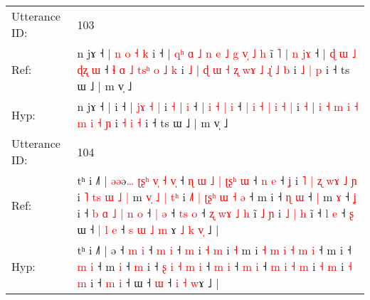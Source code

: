 \documentclass[10pt]{article}
\DeclareRobustCommand{\hl}[1]{{\textcolor{red}{#1}}}
\begin{document}
\begin{longtable}{ll}
 \\
\midrule
Utterance ID: & 103 \\
Ref: & n jɤ ˧ |\hl{ }\hl{n}\hl{ }\hl{o}\hl{ }\hl{˧}\hl{ }\hl{k} i ˧ |\hl{ }\hl{q}\hl{ʰ}\hl{ }\hl{ɑ}\hl{ }\hl{˩}\hl{ }\hl{n}\hl{ }\hl{e}\hl{ }\hl{˩}\hl{ }\hl{g} \hl{v}\hl{̩} \hl{˩} \hl{h} i\hl{̃} \hl{˥} |\hl{ }\hl{n} \hl{j}\hl{ɤ} ˧ |\hl{ }\hl{ɖ} \hl{ɯ} \hl{˩} \hl{ɖ}\hl{ʐ} \hl{ɯ} ˧ \hl{ɬ} \hl{ɑ} \hl{˩} \hl{t}\hl{s}\hl{ʰ} \hl{o} \hl{˩} \hl{k} i \hl{˩} | \hl{ɖ} \hl{ɯ} \hl{˧} \hl{ʐ} \hl{w}\hl{ɤ} \hl{˩} \hl{ɻ}\hl{̍} \hl{˩} \hl{b} i \hl{˩} \hl{|} \hl{p} i ˧ ts ɯ ˩ | m v̩ ˩
 \\
Hyp: & n jɤ ˧ |\hl{}\hl{}\hl{}\hl{}\hl{}\hl{}\hl{}\hl{} i ˧ |\hl{}\hl{}\hl{}\hl{}\hl{}\hl{}\hl{}\hl{}\hl{}\hl{}\hl{}\hl{}\hl{}\hl{}\hl{} \hl{j}\hl{ɤ} \hl{˧} \hl{|} i\hl{} \hl{˧} |\hl{}\hl{} \hl{}\hl{i} ˧ |\hl{}\hl{} \hl{i} \hl{˧} \hl{}\hl{|} \hl{i} ˧ \hl{|} \hl{i} \hl{˧} \hl{}\hl{}\hl{|} \hl{i} \hl{˧} \hl{|} i \hl{˧} | \hl{i} \hl{˧} \hl{m} \hl{i} \hl{}\hl{˧} \hl{m} \hl{}\hl{i} \hl{˧} \hl{ɲ} i \hl{˧} \hl{i} \hl{˧} i ˧ ts ɯ ˩ | m v̩ ˩
 \\
\midrule
Utterance ID: & 104 \\
Ref: & tʰ i ˩˥ | \hl{ə}\hl{ə}ə\hl{…}\hl{ }\hl{ʈ}\hl{ʂ}\hl{ʰ}\hl{ }\hl{v}\hl{̩}\hl{ }\hl{˧}\hl{ }\hl{v}\hl{̩} ˧\hl{ }\hl{ɳ}\hl{ }\hl{ɯ}\hl{ }\hl{˩}\hl{ }\hl{|} \hl{ʈ}\hl{ʂ}\hl{ʰ} \hl{ɯ} ˧ \hl{n} \hl{e} ˧ \hl{ʝ} i\hl{ }\hl{˥}\hl{ }\hl{|}\hl{ }\hl{ʐ}\hl{ }\hl{w}\hl{ɤ} \hl{˩} \hl{ɲ} i\hl{ }\hl{˥}\hl{ }\hl{t}\hl{s}\hl{ }\hl{ɯ}\hl{ }\hl{˩} \hl{|} m\hl{ }\hl{v}\hl{̩}\hl{ }\hl{˩}\hl{ }\hl{|}\hl{ }\hl{t}\hl{ʰ} i \hl{˩}\hl{˥} \hl{|} \hl{ʈ}\hl{ʂ}\hl{ʰ} \hl{ɯ} \hl{˧} \hl{ə} ˧ m i ˧ \hl{ɳ} \hl{ɯ} ˧\hl{ }\hl{|} m \hl{ɤ} ˧ \hl{ʝ} i ˧\hl{ }\hl{b} \hl{ɑ} \hl{˩} \hl{|} \hl{n} \hl{o} ˧ \hl{|} \hl{ə} ˧ \hl{t}\hl{s} \hl{o} ˧ \hl{ʐ} \hl{w}\hl{ɤ} \hl{˩} \hl{h} i\hl{̃} \hl{˩} \hl{ɲ} i\hl{ }\hl{˩} \hl{|} \hl{h} i\hl{̃} ˧ \hl{l} \hl{e} ˧\hl{ }\hl{ʂ} ɯ ˧\hl{ }\hl{|}\hl{ }\hl{l} \hl{e} ˧\hl{ }\hl{s} \hl{ɯ} \hl{˩} \hl{m}\hl{ }ɤ\hl{ }\hl{˩}\hl{ }\hl{k}\hl{ }\hl{v}\hl{̩} ˩ |
 \\
Hyp: & tʰ i ˩˥ | \hl{}\hl{}ə\hl{}\hl{}\hl{}\hl{}\hl{}\hl{}\hl{}\hl{}\hl{}\hl{}\hl{}\hl{}\hl{} ˧\hl{}\hl{}\hl{}\hl{}\hl{}\hl{}\hl{}\hl{} \hl{}\hl{}\hl{m} \hl{i} ˧ \hl{m} \hl{i} ˧ \hl{m} i\hl{}\hl{}\hl{}\hl{}\hl{}\hl{}\hl{}\hl{}\hl{} \hl{˧} \hl{m} i\hl{}\hl{}\hl{}\hl{}\hl{}\hl{}\hl{}\hl{}\hl{} \hl{˧} m\hl{}\hl{}\hl{}\hl{}\hl{}\hl{}\hl{}\hl{}\hl{}\hl{} i \hl{}\hl{˧} \hl{m} \hl{}\hl{}\hl{i} \hl{˧} \hl{m} \hl{i} ˧ m i ˧ \hl{m} \hl{i} ˧\hl{}\hl{} m \hl{i} ˧ \hl{m} i ˧\hl{}\hl{} \hl{ʂ} \hl{i} \hl{˧} \hl{m} \hl{i} ˧ \hl{m} \hl{i} ˧ \hl{}\hl{m} \hl{i} ˧ \hl{m} \hl{}\hl{i} \hl{˧} \hl{m} i\hl{} \hl{˧} \hl{m} i\hl{}\hl{} \hl{˧} \hl{m} i\hl{} ˧ \hl{m} \hl{i} ˧\hl{}\hl{} ɯ ˧\hl{}\hl{}\hl{}\hl{} \hl{ɯ} ˧\hl{}\hl{} \hl{i} \hl{˧} \hl{}\hl{w}ɤ\hl{}\hl{}\hl{}\hl{}\hl{}\hl{}\hl{} ˩ |

\end{longtable}
\end{document}
